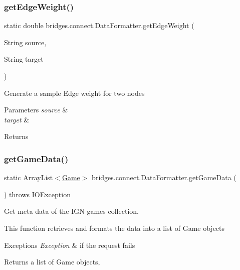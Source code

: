 \subsubsection{\texorpdfstring{get\+Edge\+Weight()}{getEdgeWeight()}}
{\footnotesize\ttfamily static double bridges.\+connect.\+Data\+Formatter.\+get\+Edge\+Weight (\begin{DoxyParamCaption}\item[{String}]{source,  }\item[{String}]{target }\end{DoxyParamCaption})\hspace{0.3cm}{\ttfamily [static]}}

Generate a sample Edge weight for two nodes 
\begin{DoxyParams}{Parameters}
{\em source} & \\
\hline
{\em target} & \\
\hline
\end{DoxyParams}
\begin{DoxyReturn}{Returns}

\end{DoxyReturn}
\mbox{\label{classbridges_1_1connect_1_1_data_formatter_a4098317468be22b4284156d6cd2212e1}} 
\subsubsection{\texorpdfstring{get\+Game\+Data()}{getGameData()}}
{\footnotesize\ttfamily static Array\+List$<$\hyperlink{classbridges_1_1data__src__dependent_1_1_game}{Game}$>$ bridges.\+connect.\+Data\+Formatter.\+get\+Game\+Data (\begin{DoxyParamCaption}{ }\end{DoxyParamCaption}) throws I\+O\+Exception\hspace{0.3cm}{\ttfamily [static]}}

Get meta data of the I\+GN games collection.

This function retrieves and formats the data into a list of Game objects


\begin{DoxyExceptions}{Exceptions}
{\em Exception} & if the request fails\\
\hline
\end{DoxyExceptions}
\begin{DoxyReturn}{Returns}
a list of Game objects, 
\end{DoxyReturn}
\mbox{\label{classbridges_1_1connect_1_1_data_formatter_a4bd21bd830238db40b511474afc77b61}} 
